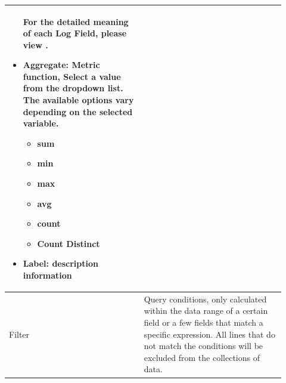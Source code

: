 \begin{description}
\begin{longtable}{p{}|p{}}
\begin{itemize}
                                    For the detailed meaning of each Log Field, please view \textbf{\hyperlink{link:Appendix C Log Fields Description}{\color{linkblue}{Appendix C Log Fields Description}}}.
                                    \item Aggregate: Metric function, Select a value from the dropdown list. The available options vary depending on the selected variable.
                                    \begin{itemize}
                                        \item sum \item min  \item max \item avg \item count \item Count Distinct
                                    \end{itemize}
                                    \item Label: description information
                                \end{itemize} \\\hline 
                Filter & Query conditions, only calculated within the data range of a certain field or a few fields that match a specific expression. All lines that do not match the conditions will be excluded from the collections of data.
                

\end{longtable}
\end{description}
